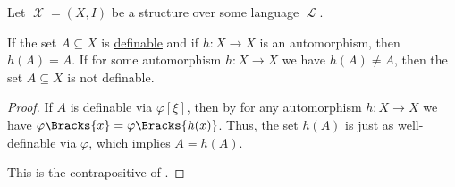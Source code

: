 \begin{corollary}\label{thm:automorphism_of_definable_set}
  Let \( \mscrX = (X, I) \) be a structure over some language \( \mscrL \).

  \begin{thmenum}
     If the set \( A \subseteq X \) is \hyperref[def:first_order_definability]{definable} and if \( h: X \to X \) is an automorphism, then \( h(A) = A \).
     If for some automorphism \( h: X \to X \) we have \( h(A) \neq A \), then the set \( A \subseteq X \) is not definable.
  \end{thmenum}
\end{corollary}
\begin{proof}
   If \( A \) is definable via \( \varphi[\xi] \), then by  for any automorphism \( h: X \to X \) we have \( \varphi\Bracks{x} = \varphi\Bracks{h(x)} \). Thus, the set \( h(A) \) is just as well-definable via \( \varphi \), which implies \( A = h(A) \).

   This is the contrapositive of .
\end{proof}
